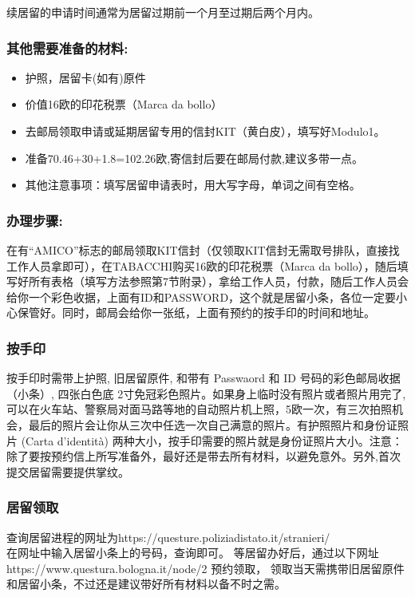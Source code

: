 续居留的申请时间通常为居留过期前一个月至过期后两个月内。 

\subsubsection{其他需要准备的材料:}
\begin{itemize} 
\item 护照，居留卡(如有)原件
\item 价值16欧的印花税票（Marca da bollo）
\item 去邮局领取申请或延期居留专用的信封KIT（黄白皮），填写好Modulo1。
\item 准备70.46+30+1.8=102.26欧,寄信封后要在邮局付款,建议多带一点。
\item 其他注意事项：填写居留申请表时，用大写字母，单词之间有空格。
\end{itemize}


\subsubsection{办理步骤:}
在有“AMICO”标志的邮局领取KIT信封（仅领取KIT信封无需取号排队，直接找工作人员拿即可），在TABACCHI购买16欧的印花税票（Marca da bollo），随后填写好所有表格（填写方法参照第7节附录），拿给工作人员，付款，随后工作人员会给你一个彩色收据，上面有ID和PASSWORD，这个就是居留小条，各位一定要小心保管好。同时，邮局会给你一张纸，上面有预约的按手印的时间和地址。


\subsubsection{按手印}
按手印时需带上护照, 旧居留原件, 和带有 Passwaord 和 ID 号码的彩色邮局收据（小条）, 四张白色底 2寸免冠彩色照片。如果身上临时没有照片或者照片用完了,可以在火车站、警察局对面马路等地的自动照片机上照，5欧一次，有三次拍照机会，最后的照片会让你从三次中任选一次自己满意的照片。有护照照片和身份证照片 (Carta d'identità)  两种大小，按手印需要的照片就是身份证照片大小。注意：除了要按预约信上所写准备外，最好还是带去所有材料，以避免意外。另外,首次提交居留需要提供掌纹。


\subsubsection{居留领取}
查询居留进程的网址为https://questure.poliziadistato.it/stranieri/\\
在网址中输入居留小条上的号码，查询即可。
等居留办好后，通过以下网址https://www.questura.bologna.it/node/2 预约领取，
领取当天需携带旧居留原件和居留小条，不过还是建议带好所有材料以备不时之需。


